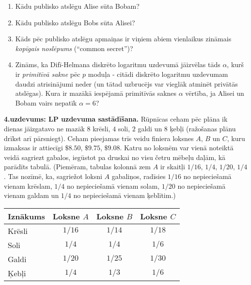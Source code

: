 \documentclass[11pt]{article}
\begin{document}
\begin{enumerate}[label=(\alph*)]
\item Kādu publisko atslēgu Alise sūta Bobam?
\item Kādu publisko atslēgu Bobs sūta Alisei?
\item Kāds pēc publisko atslēgu apmaiņas ir viņiem abiem vienlaikus zināmais 
{\em kopīgais noslēpums} (``common secret'')?
\item Zināms, ka Difī-Helmana diskrēto logaritmu uzdevumā jāizvēlas tāds $\alpha$, 
kurš ir {\em primitīvā sakne} pēc $p$ moduļa - citādi diskrēto 
logaritmu uzdevumam daudzi atrisinājumi neder (un tātad uzbrucējs var vieglāk 
atminēt privātās atslēgas). Kura ir mazākā iespējamā primitīvās saknes $\alpha$ vērtība,
ja Alisei un Bobam vairs nepatīk $\alpha=6$? 
\end{enumerate}


\vspace{6pt}
{\bf 4.uzdevums: LP uzdevuma sastādīšana.} 
Rūpnīcas ceham pēc plāna ik dienas
jāizgatavo ne mazāk $8$ krēsli, $4$ soli, $2$ galdi un $8$ ķebļi
(ražošanas plānu drīkst arī pārsniegt).
Ceham pieejamas trīs veidu finiera loksnes $A$, $B$ un $C$, 
kuru izmaksas ir attiecīgi $\$8.50$, $\$9.75$, $\$9.08$. 
Katru no loksnēm var vienā noteiktā veidā sagriezt gabalos, 
iegūstot pa druskai no visu četru mēbeļu daļām, kā parādīts tabulā.
(Piemēram, tabulas kolonnā zem $A$ ir skaitļi $1/16$, 
$1/4$, $1/20$, $1/4$. Tas nozīmē, ka, sagriežot loksni $A$ gabaliņos, 
radīsies $1/16$ no nepieciešamā vienam krēslam,
$1/4$ no nepieciešamā vienam solam, 
$1/20$ no nepieciešamā vienam galdam un
$1/4$ no nepieciešamā vienam ķeblītim.)

\begin{tabular}{|l|c|c|c|} \hline
{\bf Iznākums} & {\bf Loksne $A$} & {\bf Loksne $B$} & {\bf Loksne $C$} \\ \hline
Krēsli & $1/16$ & $1/14$ & $1/18$ \\ \hline
Soli & $1/4$ & $1/4$ & $1/6$ \\ \hline
Galdi & $1/20$ & $1/25$ & $1/30$ \\ \hline
Ķebļi & $1/4$ & $1/3$ & $1/6$ \\ \hline
\end{tabular}
\end{document}
